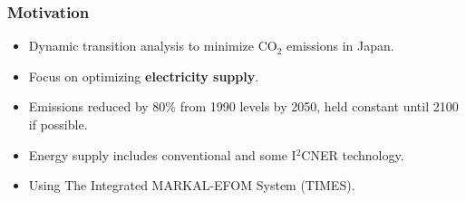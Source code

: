
\begin{frame}
  \frametitle{Motivation}
   \begin{itemize}
   
   \item Dynamic transition analysis to minimize CO$_2$ emissions in Japan.
   
   \item Focus on optimizing \textbf{electricity supply}.
   
   \item Emissions reduced by 80\% from 1990 levels by 2050, held constant until 2100 if possible.
   
   \item Energy supply includes conventional and some I$^2$CNER technology.
   
   \item Using The Integrated MARKAL-EFOM System (TIMES).
   \end{itemize}
%
        
\end{frame}
